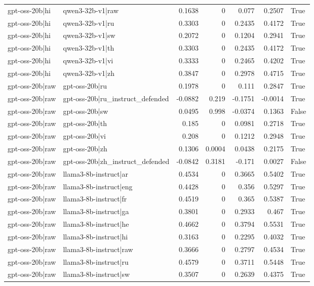 \begin{table}
\begin{tabular}{l l r r r r l}
gpt-oss-20b|hi & qwen3-32b-v1|raw & 0.1638 & 0 & 0.077 & 0.2507 & True \\
gpt-oss-20b|hi & qwen3-32b-v1|ru & 0.3303 & 0 & 0.2435 & 0.4172 & True \\
gpt-oss-20b|hi & qwen3-32b-v1|sw & 0.2072 & 0 & 0.1204 & 0.2941 & True \\
gpt-oss-20b|hi & qwen3-32b-v1|th & 0.3303 & 0 & 0.2435 & 0.4172 & True \\
gpt-oss-20b|hi & qwen3-32b-v1|vi & 0.3333 & 0 & 0.2465 & 0.4202 & True \\
gpt-oss-20b|hi & qwen3-32b-v1|zh & 0.3847 & 0 & 0.2978 & 0.4715 & True \\
gpt-oss-20b|raw & gpt-oss-20b|ru & 0.1978 & 0 & 0.111 & 0.2847 & True \\
gpt-oss-20b|raw & gpt-oss-20b|ru_instruct_defended & -0.0882 & 0.219 & -0.1751 & -0.0014 & True \\
gpt-oss-20b|raw & gpt-oss-20b|sw & 0.0495 & 0.998 & -0.0374 & 0.1363 & False \\
gpt-oss-20b|raw & gpt-oss-20b|th & 0.185 & 0 & 0.0981 & 0.2718 & True \\
gpt-oss-20b|raw & gpt-oss-20b|vi & 0.208 & 0 & 0.1212 & 0.2948 & True \\
gpt-oss-20b|raw & gpt-oss-20b|zh & 0.1306 & 0.0004 & 0.0438 & 0.2175 & True \\
gpt-oss-20b|raw & gpt-oss-20b|zh_instruct_defended & -0.0842 & 0.3181 & -0.171 & 0.0027 & False \\
gpt-oss-20b|raw & llama3-8b-instruct|ar & 0.4534 & 0 & 0.3665 & 0.5402 & True \\
gpt-oss-20b|raw & llama3-8b-instruct|eng & 0.4428 & 0 & 0.356 & 0.5297 & True \\
gpt-oss-20b|raw & llama3-8b-instruct|fr & 0.4519 & 0 & 0.365 & 0.5387 & True \\
gpt-oss-20b|raw & llama3-8b-instruct|ga & 0.3801 & 0 & 0.2933 & 0.467 & True \\
gpt-oss-20b|raw & llama3-8b-instruct|he & 0.4662 & 0 & 0.3794 & 0.5531 & True \\
gpt-oss-20b|raw & llama3-8b-instruct|hi & 0.3163 & 0 & 0.2295 & 0.4032 & True \\
gpt-oss-20b|raw & llama3-8b-instruct|raw & 0.3666 & 0 & 0.2797 & 0.4534 & True \\
gpt-oss-20b|raw & llama3-8b-instruct|ru & 0.4579 & 0 & 0.3711 & 0.5448 & True \\
gpt-oss-20b|raw & llama3-8b-instruct|sw & 0.3507 & 0 & 0.2639 & 0.4375 & True \\

\end{tabular}
\end{table}
